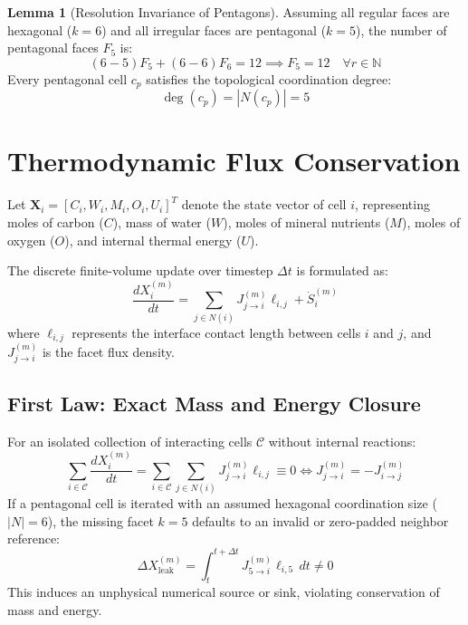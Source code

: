 \documentclass[11pt,a4paper]{article}
\theoremstyle{definition}
\newtheorem{lemma}{Lemma}
\begin{document}
\begin{lemma}[Resolution Invariance of Pentagons]
Assuming all regular faces are hexagonal ($k=6$) and all irregular faces are pentagonal ($k=5$), the number of pentagonal faces $F_5$ is:
\begin{equation}
(6 - 5) F_5 + (6 - 6) F_6 = 12 \implies F_5 = 12 \quad \forall r \in \mathbb{N}
\end{equation}
Every pentagonal cell $c_p$ satisfies the topological coordination degree:
\begin{equation}
\operatorname{deg}(c_p) = |N(c_p)| = 5
\end{equation}
\end{lemma}

\section{Thermodynamic Flux Conservation}

Let $\mathbf{X}_i = [C_i, W_i, M_i, O_i, U_i]^T$ denote the state vector of cell $i$, representing moles of carbon ($C$), mass of water ($W$), moles of mineral nutrients ($M$), moles of oxygen ($O$), and internal thermal energy ($U$).

The discrete finite-volume update over timestep $\Delta t$ is formulated as:
\begin{equation}
\frac{d X^{(m)}_i}{dt} = \sum_{j \in N(i)} J^{(m)}_{j \to i} \ell_{i,j} + \dot{S}^{(m)}_i
\end{equation}
where $\ell_{i,j}$ represents the interface contact length between cells $i$ and $j$, and $J^{(m)}_{j \to i}$ is the facet flux density.

\subsection{First Law: Exact Mass and Energy Closure}
For an isolated collection of interacting cells $\mathcal{C}$ without internal reactions:
\begin{equation}
\sum_{i \in \mathcal{C}} \frac{d X^{(m)}_i}{dt} = \sum_{i \in \mathcal{C}} \sum_{j \in N(i)} J^{(m)}_{j \to i} \ell_{i,j} \equiv 0 \iff J^{(m)}_{j \to i} = -J^{(m)}_{i \to j}
\end{equation}
If a pentagonal cell is iterated with an assumed hexagonal coordination size ($|N| = 6$), the missing facet $k=5$ defaults to an invalid or zero-padded neighbor reference:
\begin{equation}
\Delta X^{(m)}_{\text{leak}} = \int_t^{t+\Delta t} J^{(m)}_{5 \to i} \ell_{i,5} \, dt \neq 0
\end{equation}
This induces an unphysical numerical source or sink, violating conservation of mass and energy.
\end{document}
